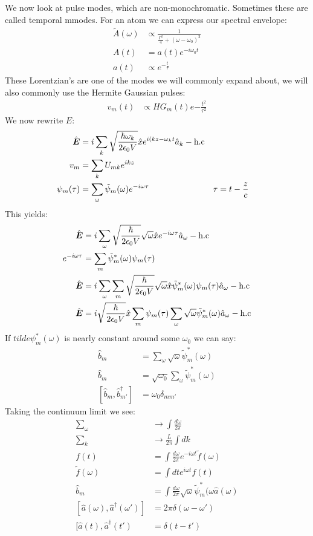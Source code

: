 We now look at pulse modes, which are non-monochromatic. Sometimes these are called temporal mmodes. For an atom we can express our spectral envelope:
\begin{align*}
	\tilde{A}(\omega) &\propto \frac{1}{\frac{\Gamma^2}{4} + (\omega - \omega_0)^2} \\
	A(t) &= a(t)  e^{-i\omega_0 t} \\
	a(t) &\propto e^{-\frac{t}{\tau}}
\end{align*}
These Lorentzian's are one of the modes we will commonly expand about, we will also commonly use the Hermite Gaussian pulses:
\begin{align*}
	v_m(t) &\propto HG_m(t) e{-\frac{t^2}{\tau^2}}
\end{align*}
We now rewrite $E$:
\begin{align*}
	\hat{\bm{E}} &= i\sum_k \sqrt{\frac{\hbar\omega_k}{2\epsilon_0 V}} \hat{x} e^{i(kz-\omega_k t} \hat{a}_k - \text{h.c} \\
	v_m &= \sum_k U_{mk} e^{ikz} \\
	\psi_m(\tau) &= \sum_\omega \tilde{\psi}_m(\omega) e^{-i\omega\tau} & \tau &= t- \frac{z}{c}
\end{align*}
This yields:
\begin{align*}
	\hat{\bm{E}} &= i\sum_\omega \sqrt{\frac{\hbar}{2\epsilon_0 V}}\sqrt{\omega} \hat{x} e^{-i\omega\tau} \hat{a}_\omega - \text{h.c} \\
	e^{-i\omega\tau} &= \sum_m \tilde{\psi}_{m}^*(\omega) \psi_m(\tau) \\
	\hat{\bm{E}} &= i\sum_\omega \sum_m \sqrt{\frac{\hbar}{2\epsilon_0 V}}\sqrt{\omega} \hat{x} \tilde{\psi}_{m}^*(\omega) \psi_m(\tau) \hat{a}_\omega - \text{h.c} \\
	\hat{\bm{E}} &= i\sqrt{\frac{\hbar}{2\epsilon_0 V}} \hat{x}\sum_m  \psi_m(\tau) \sum_\omega \sqrt{\omega}\tilde{\psi}_{m}^*(\omega) \hat{a}_\omega - \text{h.c}
\end{align*}
If $tilde{\psi}_m^*(\omega)$ is nearly constant around some $\omega_0$ we can say:
\begin{align*}
	\hat{b}_m &= \sum_\omega \sqrt{\omega} \tilde{\psi}_m^*(\omega) \\
	\hat{b}_m &= \sqrt{\omega_0} \sum_\omega \tilde{\psi}_m^*(\omega) \\
	[\hat{b}_m, \hat{b}_{m'}^\dagger] &= \omega_0\delta_{mm'}
\end{align*}
Taking the continuum limit we see:
\begin{align*}
	\sum_\omega &\to \int \frac{d\omega}{2\pi} \\
	\sum_k &\to \frac{L}{2\pi} \int dk \\
	f(t) &= \int \frac{d\omega}{2\pi} e^{-i\omega t}\tilde{f}(\omega) \\
	\tilde{f}(\omega) &= \int dt e^{i\omega t}f(t) \\
	\hat{b}_m &= \int \frac{d\omega}{2\pi} \sqrt{\omega} \tilde{\psi}_m^*(\omega \hat{a}(\omega) \\
	[\hat{a}(\omega),\hat{a}^\dagger(\omega')] &= 2\pi \delta(\omega - \omega') \\
	[\hat{a}(t),\hat{a}^\dagger(t') &= \delta(t-t')
\end{align*}
